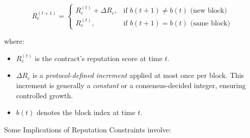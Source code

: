 \documentclass{article}
\begin{document}
\begin{equation}
    R_c^{(t+1)} =
    \begin{cases} 
    R_c^{(t)} + \Delta R_c, & \text{if } b(t+1) \neq b(t) \text{ (new block)} \\
    R_c^{(t)}, & \text{if } b(t+1) = b(t) \text{ (same block)}
    \end{cases}
\end{equation}

where:
\begin{itemize}
    \item \( R_c^{(t)} \) is the contract’s reputation score at time \( t \).
    \item \( \Delta R_c \) is a \textit{protocol-defined increment} applied at most once per block. This increment is generally a \textit{constant} or a consensus-decided integer, ensuring controlled growth.
    \item \( b(t) \) denotes the block index at time \( t \).
\end{itemize}

Some Implications of Reputation Constraints involve:
\end{document}
